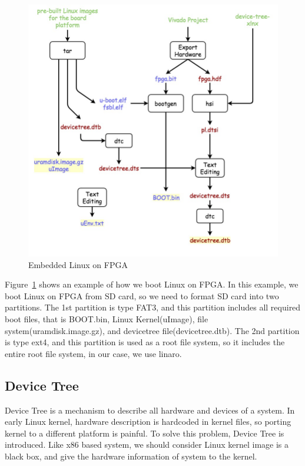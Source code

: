 \begin{figure}[!htb]
  \centering
  \includegraphics[scale=0.5]{images/embedded_linux.jpg}
  \caption[Embedded Linux on FPGA]{Embedded Linux on FPGA}
  \label{fig:Embedded Linux on FPGA}
\end{figure}

Figure~\ref{fig:Embedded Linux on FPGA} shows an example of how we boot Linux on FPGA\cite{concise}. In this example, we boot Linux on FPGA from SD card, so we need to format SD card into two partitions. The 1st partition is type FAT3, and this partition includes all required boot files, that is BOOT.bin, Linux Kernel(uImage), file system(uramdisk.image.gz), and devicetree file(devicetree.dtb). The 2nd partition is type ext4, and this partition is used as a root file system, so it includes the entire root file system, in our case, we use linaro. 

\subsection{Device Tree}
\label{subsec:Device Tree}

Device Tree is a mechanism to describe all hardware and devices of a system. In early Linux 
kernel, hardware description is hardcoded in kernel files, so porting kernel to a different
platform is painful. To solve this problem, Device Tree is introduced. 
Like x86 based system, we should consider Linux kernel image is a black box, and give the 
hardware information of system to the kernel.
%


